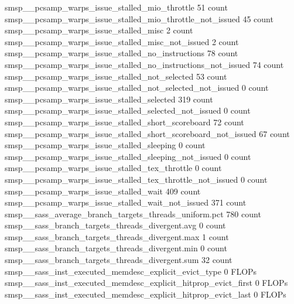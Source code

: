 smsp__pcsamp_warps_issue_stalled_mio_throttle                                                 51 count
smsp__pcsamp_warps_issue_stalled_mio_throttle_not_issued                                      45 count
smsp__pcsamp_warps_issue_stalled_misc                                                          2 count
smsp__pcsamp_warps_issue_stalled_misc_not_issued                                               2 count
smsp__pcsamp_warps_issue_stalled_no_instructions                                              78 count
smsp__pcsamp_warps_issue_stalled_no_instructions_not_issued                                   74 count
smsp__pcsamp_warps_issue_stalled_not_selected                                                 53 count
smsp__pcsamp_warps_issue_stalled_not_selected_not_issued                                       0 count
smsp__pcsamp_warps_issue_stalled_selected                                                    319 count
smsp__pcsamp_warps_issue_stalled_selected_not_issued                                           0 count
smsp__pcsamp_warps_issue_stalled_short_scoreboard                                             72 count
smsp__pcsamp_warps_issue_stalled_short_scoreboard_not_issued                                  67 count
smsp__pcsamp_warps_issue_stalled_sleeping                                                      0 count
smsp__pcsamp_warps_issue_stalled_sleeping_not_issued                                           0 count
smsp__pcsamp_warps_issue_stalled_tex_throttle                                                  0 count
smsp__pcsamp_warps_issue_stalled_tex_throttle_not_issued                                       0 count
smsp__pcsamp_warps_issue_stalled_wait                                                        409 count
smsp__pcsamp_warps_issue_stalled_wait_not_issued                                             371 count
smsp__sass_average_branch_targets_threads_uniform.pct                                        780 count
smsp__sass_branch_targets_threads_divergent.avg                                                0 count
smsp__sass_branch_targets_threads_divergent.max                                                1 count
smsp__sass_branch_targets_threads_divergent.min                                                0 count
smsp__sass_branch_targets_threads_divergent.sum                                               32 count
smsp__sass_inst_executed_memdesc_explicit_evict_type                                           0 FLOPs
smsp__sass_inst_executed_memdesc_explicit_hitprop_evict_first                                  0 FLOPs
smsp__sass_inst_executed_memdesc_explicit_hitprop_evict_last                                   0 FLOPs
